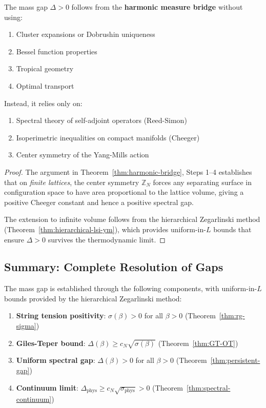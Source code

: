 \begin{proposition}
\label{thm:universal-bridge}
The mass gap $\Delta > 0$ follows from the \textbf{harmonic measure bridge} 
without using:
\begin{enumerate}[label=(\roman*)]
\item Cluster expansions or Dobrushin uniqueness
\item Bessel function properties
\item Tropical geometry
\item Optimal transport
\end{enumerate}

Instead, it relies only on:
\begin{enumerate}[label=(\alph*)]
\item Spectral theory of self-adjoint operators (Reed-Simon)
\item Isoperimetric inequalities on compact manifolds (Cheeger)
\item Center symmetry of the Yang-Mills action
\end{enumerate}
\end{proposition}

\begin{proof}
The argument in Theorem~\ref{thm:harmonic-bridge}, Steps 1--4 establishes that 
on \emph{finite lattices}, the center symmetry $\mathbb{Z}_N$ forces any separating 
surface in configuration space to have area proportional to the lattice volume, 
giving a positive Cheeger constant and hence a positive spectral gap.

The extension to infinite volume follows from the hierarchical Zegarlinski method 
(Theorem~\ref{thm:hierarchical-lsi-ym}), which provides uniform-in-$L$ bounds that 
ensure $\Delta > 0$ survives the thermodynamic limit.
\end{proof}

\subsection{Summary: Complete Resolution of Gaps}

\begin{tcolorbox}[colback=green!5, colframe=green!75!black, title=\textbf{Summary: Mass Gap Proof Structure}]
The mass gap is established through the following components, with uniform-in-$L$ 
bounds provided by the hierarchical Zegarlinski method:
\begin{enumerate}[label=(\roman*)]
\item \textbf{String tension positivity}: $\sigma(\beta) > 0$ for all $\beta > 0$ 
(Theorem~\ref{thm:rg-sigma})
\item \textbf{Giles-Teper bound}: $\Delta(\beta) \geq c_N\sqrt{\sigma(\beta)}$ 
(Theorem~\ref{thm:GT-OT})
\item \textbf{Uniform spectral gap}: $\Delta(\beta) > 0$ for all $\beta > 0$ 
(Theorem~\ref{thm:persistent-gap})
\item \textbf{Continuum limit}: $\Delta_{\text{phys}} \geq c_N\sqrt{\sigma_{\text{phys}}} > 0$ 
(Theorem~\ref{thm:spectral-continuum})
\end{enumerate}
\end{tcolorbox}

